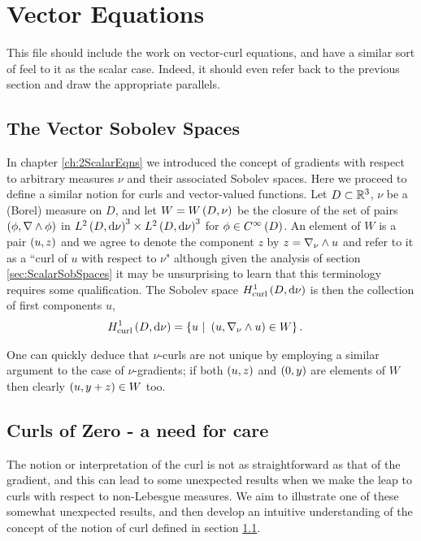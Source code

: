 \chapter{Vector Equations} \label{ch:3VectorEqns}
This file should include the work on vector-curl equations, and have a similar sort of feel to it as the scalar case. Indeed, it should even refer back to the previous section and draw the appropriate parallels.

\section{The Vector Sobolev Spaces} \label{sec:VectorSobSpaces}
In chapter \ref{ch:2ScalarEqns} we introduced the concept of gradients with respect to arbitrary measures $\nu$ and their associated Sobolev spaces.
Here we proceed to define a similar notion for curls and vector-valued functions.
Let $D\subset\mathbb{R}^3$, $\nu$ be a (Borel) measure on $D$, and let $W=W\left( D,\nu \right)$ be the closure of the set of pairs $\left( \phi, \nabla\wedge\phi \right)$ in $L^{2}\left( D,\mathrm{d}\nu \right)^3\times L^{2}\left( D,\mathrm{d}\nu \right)^3$ for $\phi\in C^{\infty}\left( D \right)$.
An element of $W$ is a pair $\left( u,z \right)$ and we agree to denote the component $z$ by $z=\nabla_{\nu}\wedge u$ and refer to it as a ``curl of $u$ with respect to $\nu$" although given the analysis of section \ref{sec:ScalarSobSpaces} it may be unsurprising to learn that this terminology requires some qualification.
The Sobolev space $H^1_\mathrm{curl}\left( D, \mathrm{d}\nu \right)$ is then the collection of first components $u$,
\begin{align*}
	\curlSob{D}{\nu} &= \clbracs{u \ \vert \ \bracs{u,\curl{\nu}u}\in W}.
\end{align*}

One can quickly deduce that $\nu$-curls are not unique by employing a similar argument to the case of $\nu$-gradients; if both $\left( u,z \right)$ and $\left( 0,y \right)$ are elements of $W$ then clearly $\left( u,y+z \right)\in W$ too.


\section{Curls of Zero - a need for care}
The notion or interpretation of the curl is not as straightforward as that of the gradient, and this can lead to some unexpected results when we make the leap to curls with respect to non-Lebesgue measures.
We aim to illustrate one of these somewhat unexpected results, and then develop an intuitive understanding of the concept of the notion of curl defined in section \ref{sec:VectorSobSpaces}. \newline

